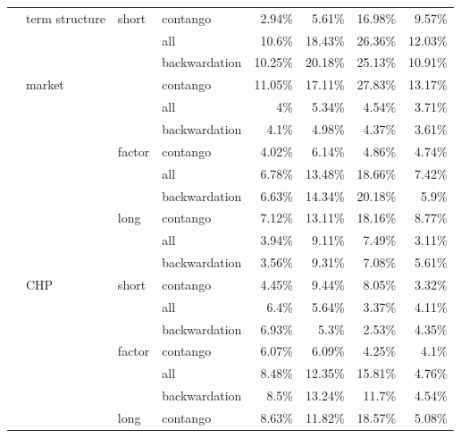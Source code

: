 \documentclass[]{elsarticle} %
\begin{document}
\begin{longtable}[t]{>{}llllrrrr}
\nopagebreak
\multirow[t]{-30}{*}{\raggedright\arraybackslash \textbf{CHP}} & \multirow[t]{-9}{*}{\raggedright\arraybackslash term structure} & \multirow[t]{-3}{*}{\raggedright\arraybackslash short} & contango & 2.94\% & 5.61\% & 16.98\% & 9.57\%\\
\cmidrule{1-8}\pagebreak[0]
 &  &  & all & 10.6\% & 18.43\% & 26.36\% & 12.03\%\\
\nopagebreak
 &  &  & backwardation & 10.25\% & 20.18\% & 25.13\% & 10.91\%\\
\nopagebreak
 & \multirow[t]{-3}{*}{\raggedright\arraybackslash market} &  & contango & 11.05\% & 17.11\% & 27.83\% & 13.17\%\\
\nopagebreak
 &  &  & all & 4\% & 5.34\% & 4.54\% & 3.71\%\\
\nopagebreak
 &  &  & backwardation & 4.1\% & 4.98\% & 4.37\% & 3.61\%\\
\nopagebreak
 &  & \multirow[t]{-6}{*}{\raggedright\arraybackslash factor} & contango & 4.02\% & 6.14\% & 4.86\% & 4.74\%\\
\nopagebreak
 &  &  & all & 6.78\% & 13.48\% & 18.66\% & 7.42\%\\
\nopagebreak
 &  &  & backwardation & 6.63\% & 14.34\% & 20.18\% & 5.9\%\\
\nopagebreak
 &  & \multirow[t]{-3}{*}{\raggedright\arraybackslash long} & contango & 7.12\% & 13.11\% & 18.16\% & 8.77\%\\
\nopagebreak
 &  &  & all & 3.94\% & 9.11\% & 7.49\% & 3.11\%\\
\nopagebreak
 &  &  & backwardation & 3.56\% & 9.31\% & 7.08\% & 5.61\%\\
\nopagebreak
 & \multirow[t]{-9}{*}{\raggedright\arraybackslash CHP} & \multirow[t]{-3}{*}{\raggedright\arraybackslash short} & contango & 4.45\% & 9.44\% & 8.05\% & 3.32\%\\
\nopagebreak
 &  &  & all & 6.4\% & 5.64\% & 3.37\% & 4.11\%\\
\nopagebreak
 &  &  & backwardation & 6.93\% & 5.3\% & 2.53\% & 4.35\%\\
\nopagebreak
 &  & \multirow[t]{-3}{*}{\raggedright\arraybackslash factor} & contango & 6.07\% & 6.09\% & 4.25\% & 4.1\%\\
\nopagebreak
 &  &  & all & 8.48\% & 12.35\% & 15.81\% & 4.76\%\\
\nopagebreak
 &  &  & backwardation & 8.5\% & 13.24\% & 11.7\% & 4.54\%\\
\nopagebreak
 &  & \multirow[t]{-3}{*}{\raggedright\arraybackslash long} & contango & 8.63\% & 11.82\% & 18.57\% & 5.08\%\\

\end{longtable}
\end{document}
